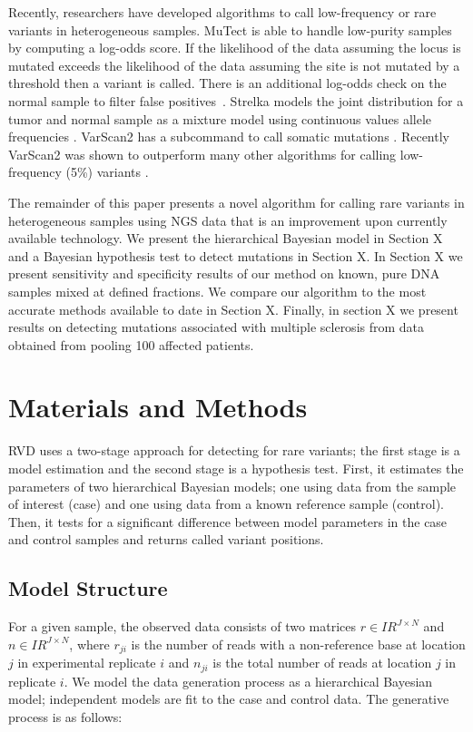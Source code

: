 \documentclass[11pt,reqno]{amsart}
\newcommand{\RR}{I\!\!R} %
\begin{document}
Recently, researchers have developed algorithms to call low-frequency or rare variants in heterogeneous samples. MuTect is able to handle low-purity samples by computing a log-odds score. If the likelihood of the data assuming the locus is mutated exceeds the likelihood of the data assuming the site is not mutated by a threshold then a variant is called. There is an additional log-odds check on the normal sample to filter false positives~\cite{Cibulskis2013}. Strelka models the joint distribution for a tumor and normal sample as a mixture model using continuous values allele frequencies \cite{}. VarScan2 has a subcommand to call somatic mutations \cite{}. Recently VarScan2 was shown to outperform many other algorithms for calling low-frequency (5\%) variants \cite{}. 

The remainder of this paper presents a novel algorithm for calling rare variants in heterogeneous samples using NGS data that is an improvement upon currently available technology. We present the hierarchical Bayesian model in Section X and a Bayesian hypothesis test to detect mutations in Section X. In Section X we present sensitivity and specificity results of our method on known, pure DNA samples mixed at defined fractions. We compare our algorithm to the most accurate methods available to date in Section X. Finally, in section X we present results on detecting mutations associated with multiple sclerosis from data obtained from pooling 100 affected patients.

\section{Materials and Methods}

RVD uses a two-stage approach for detecting for rare variants; the first stage is a model estimation and the second stage is a hypothesis test. First, it estimates the parameters of two hierarchical Bayesian models; one using data from the sample of interest (case) and one using data from a known reference sample (control). Then, it tests for a significant difference between model parameters in the case and control samples and returns called variant positions.

\subsection{Model Structure}

For a given sample, the observed data consists of two matrices $r \in \RR^{J \times N}$ and $n \in \RR^{J \times N}$, where $r_{ji}$ is the number of reads with a non-reference base at location $j$ in experimental replicate $i$ and $n_{ji}$ is the total number of reads at location $j$ in replicate $i$. We model the data generation process as a hierarchical Bayesian model; independent models are fit to the case and control data. The generative process is as follows:
\end{document}
